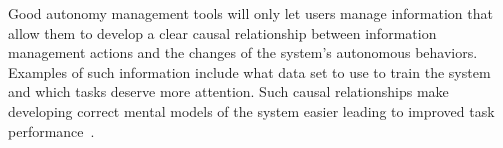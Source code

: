 %
%

Good autonomy management tools will only let users manage information that allow them to develop a clear causal relationship between information management actions and the changes of the system's autonomous behaviors. Examples of such information include what data set to use to train the system and which tasks deserve more attention. Such causal relationships make developing correct mental models of the system easier leading to improved task performance~\cite{Moray1990Lattice}. 


